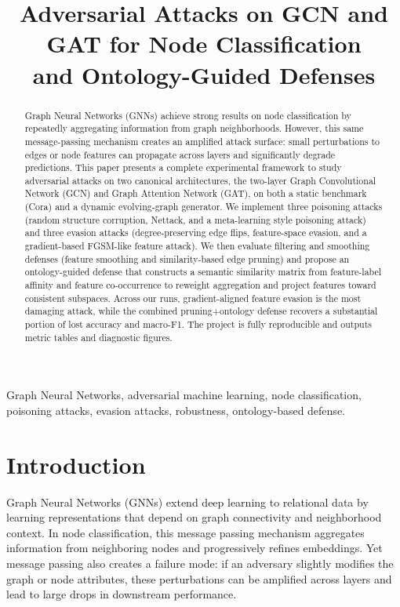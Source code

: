 \documentclass[conference]{IEEEtran}
\title{Adversarial Attacks on GCN and GAT for Node Classification\\and Ontology-Guided Defenses}
\author{
\IEEEauthorblockN{EaswarKrishna A P}
\IEEEauthorblockA{
Department of Network Engineering\\
India\\
email: (omitted for anonymized draft)
}}
\begin{document}
\maketitle

\begin{abstract}
Graph Neural Networks (GNNs) achieve strong results on node classification by repeatedly aggregating information from graph neighborhoods. However, this same message-passing mechanism creates an amplified attack surface: small perturbations to edges or node features can propagate across layers and significantly degrade predictions. This paper presents a complete experimental framework to study adversarial attacks on two canonical architectures, the two-layer Graph Convolutional Network (GCN) and Graph Attention Network (GAT), on both a static benchmark (Cora) and a dynamic evolving-graph generator. We implement three poisoning attacks (random structure corruption, Nettack, and a meta-learning style poisoning attack) and three evasion attacks (degree-preserving edge flips, feature-space evasion, and a gradient-based FGSM-like feature attack). We then evaluate filtering and smoothing defenses (feature smoothing and similarity-based edge pruning) and propose an ontology-guided defense that constructs a semantic similarity matrix from feature-label affinity and feature co-occurrence to reweight aggregation and project features toward consistent subspaces. Across our runs, gradient-aligned feature evasion is the most damaging attack, while the combined pruning+ontology defense recovers a substantial portion of lost accuracy and macro-F1. The project is fully reproducible and outputs metric tables and diagnostic figures.
\end{abstract}

\begin{IEEEkeywords}
Graph Neural Networks, adversarial machine learning, node classification, poisoning attacks, evasion attacks, robustness, ontology-based defense.
\end{IEEEkeywords}

\section{Introduction}
Graph Neural Networks (GNNs) extend deep learning to relational data by learning representations that depend on graph connectivity and neighborhood context. In node classification, this message passing mechanism aggregates information from neighboring nodes and progressively refines embeddings. Yet message passing also creates a failure mode: if an adversary slightly modifies the graph or node attributes, these perturbations can be amplified across layers and lead to large drops in downstream performance.
\end{document}
